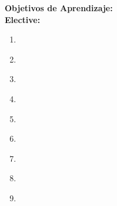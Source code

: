 \noindent \textbf{Objetivos de Aprendizaje:}\\
\noindent \textbf{Elective:}
\begin{enumerate}
	\setcounter{enumi}{0}
	\item \ISReasoningUnderUncertaintyLOApplyBayesDetermine\xspace[\ISReasoningUnderUncertaintyLOApplyBayesDetermineLevel]\label{sec:BOK:ISReasoningUnderUncertaintyLOApplyBayesDetermine}
	\item \ISReasoningUnderUncertaintyLOExplainHowAssertions\xspace[\ISReasoningUnderUncertaintyLOExplainHowAssertionsLevel]\label{sec:BOK:ISReasoningUnderUncertaintyLOExplainHowAssertions}
	\item \ISReasoningUnderUncertaintyLOIdentifyExamplesRepresentations\xspace[\ISReasoningUnderUncertaintyLOIdentifyExamplesRepresentationsLevel]\label{sec:BOK:ISReasoningUnderUncertaintyLOIdentifyExamplesRepresentations}
	\item \ISReasoningUnderUncertaintyLOStateTheExact\xspace[\ISReasoningUnderUncertaintyLOStateTheExactLevel]\label{sec:BOK:ISReasoningUnderUncertaintyLOStateTheExact}
	\item \ISReasoningUnderUncertaintyLODesignAndLeast\xspace[\ISReasoningUnderUncertaintyLODesignAndLeastLevel]\label{sec:BOK:ISReasoningUnderUncertaintyLODesignAndLeast}
	\item \ISReasoningUnderUncertaintyLODescribeTheTemporal\xspace[\ISReasoningUnderUncertaintyLODescribeTheTemporalLevel]\label{sec:BOK:ISReasoningUnderUncertaintyLODescribeTheTemporal}
	\item \ISReasoningUnderUncertaintyLODesignAndHmm\xspace[\ISReasoningUnderUncertaintyLODesignAndHmmLevel]\label{sec:BOK:ISReasoningUnderUncertaintyLODesignAndHmm}
	\item \ISReasoningUnderUncertaintyLODescribeThePreferences\xspace[\ISReasoningUnderUncertaintyLODescribeThePreferencesLevel]\label{sec:BOK:ISReasoningUnderUncertaintyLODescribeThePreferences}
	\item \ISReasoningUnderUncertaintyLOExplainHowAnd\xspace[\ISReasoningUnderUncertaintyLOExplainHowAndLevel]\label{sec:BOK:ISReasoningUnderUncertaintyLOExplainHowAnd}
\end{enumerate}



